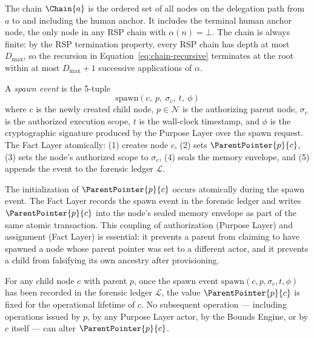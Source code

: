 The chain $\Chain{a}$ is the ordered set of all nodes on the delegation path from $a$ to and including the human anchor. It includes the terminal human anchor node, the only node in any RSP chain with $\alpha(n) = \bot$. The chain is always finite: by the RSP termination property, every RSP chain has depth at most $D_{\max}$, so the recursion in Equation~\ref{eq:chain-recursive} terminates at the root within at most $D_{\max} + 1$ successive applications of $\alpha$.

\begin{dfn}
\label{dfn:spawn-event}
A \emph{spawn event} is the 5-tuple
\begin{equation}
\mathrm{spawn}(c,\ p,\ \sigma_c,\ t,\ \phi)
\end{equation}
where $c$ is the newly created child node, $p \in \mathcal{N}$ is the authorizing parent node, $\sigma_c$ is the authorized execution scope, $t$ is the wall-clock timestamp, and $\phi$ is the cryptographic signature produced by the Purpose Layer over the spawn request. The Fact Layer atomically: (1) creates node $c$, (2) sets $\ParentPointer{p}{c}$, (3) sets the node's authorized scope to $\sigma_c$, (4) seals the memory envelope, and (5) appends the event to the forensic ledger $\mathcal{L}$.
\end{dfn}

The initialization of $\ParentPointer{p}{c}$ occurs atomically during the spawn event. The Fact Layer records the spawn event in the forensic ledger and writes $\ParentPointer{p}{c}$ into the node's sealed memory envelope as part of the same atomic transaction. This coupling of authorization (Purpose Layer) and assignment (Fact Layer) is essential: it prevents a parent from claiming to have spawned a node whose parent pointer was set to a different actor, and it prevents a child from falsifying its own ancestry after provisioning.

\begin{prop}
\label{prop:parent-pointer-immutable}
For any child node $c$ with parent $p$, once the spawn event $\mathrm{spawn}(c, p, \sigma_c, t, \phi)$ has been recorded in the forensic ledger $\mathcal{L}$, the value $\ParentPointer{p}{c}$ is fixed for the operational lifetime of $c$. No subsequent operation --- including operations issued by $p$, by any Purpose Layer actor, by the Bounds Engine, or by $c$ itself --- can alter $\ParentPointer{p}{c}$.
\end{prop}

